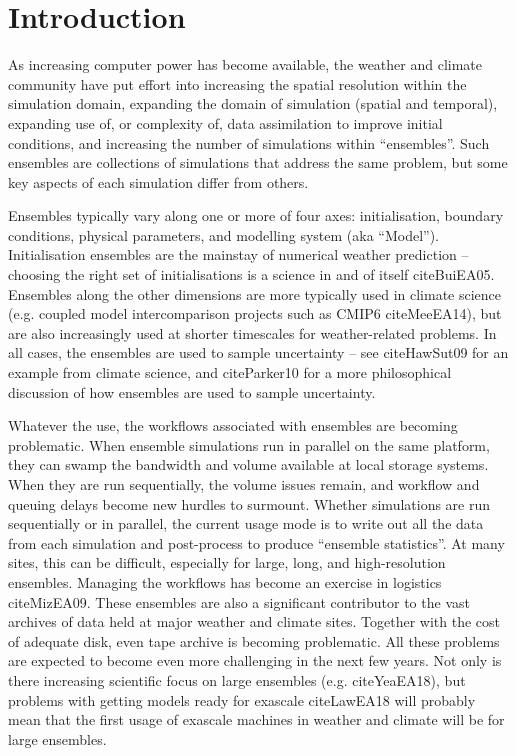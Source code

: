 \documentclass[twocolumn, 12pt]{paper}
\begin{document}
\section{Introduction}

As increasing computer power has become available, the weather and climate community have put effort into increasing the spatial resolution within the simulation domain, expanding the domain of simulation (spatial and temporal), expanding use of, or complexity of, data assimilation to improve initial conditions, and increasing the number of simulations within ``ensembles''.
Such ensembles are collections of simulations that address the same problem, but some key aspects of each simulation differ from others.

Ensembles typically vary along one or more of four axes: initialisation, boundary conditions, physical parameters, and modelling system (aka ``Model'').
Initialisation ensembles are the mainstay of numerical weather prediction -- choosing the right set of initialisations is a science in and of itself cite{BuiEA05}.
Ensembles along the other dimensions are more typically used in climate science (e.g. coupled model intercomparison projects such as CMIP6 cite{MeeEA14}), but are also increasingly used at shorter timescales for weather-related problems.
In all cases, the ensembles are used to sample uncertainty -- see cite{HawSut09} for an example from climate science, and cite{Parker10} for a more philosophical discussion of how ensembles are used to sample uncertainty.

Whatever the use, the workflows associated with ensembles are becoming problematic.
When ensemble simulations run in parallel on the same platform, they can swamp the bandwidth and volume available at local storage systems.
When they are run sequentially, the volume issues remain, and workflow and queuing delays become new hurdles to surmount.
Whether simulations are run sequentially or in parallel, the current usage mode is to write out all the data from each simulation and post-process to produce ``ensemble statistics''.
At many sites, this can be difficult, especially for large, long, and high-resolution ensembles.
Managing the workflows has become an exercise in logistics cite{MizEA09}.
These ensembles are also a significant contributor to the vast archives of data held at major weather and climate sites.
Together with the cost of adequate disk, even tape archive is becoming problematic.
All these problems are expected to become even more challenging in the next few years.
Not only is there increasing scientific focus on large ensembles (e.g. cite{YeaEA18}), but problems with getting models ready for exascale cite{LawEA18} will probably mean that the first usage of exascale machines in weather and climate will be for large ensembles.
\end{document}
